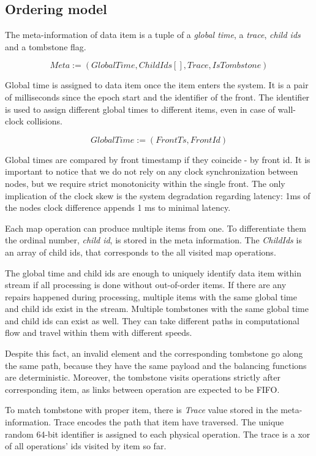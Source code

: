 \label{fs-impl}

\subsection{Ordering model}
The meta-information of data item is a tuple of a {\it global time}, a {\it trace}, {\it child ids} and a tombstone flag.

\[Meta := (GlobalTime, ChildIds[], Trace, IsTombstone)\]

Global time is assigned to data item once the item enters the system. It is a pair of milliseconds since the epoch start and the identifier of the front. The identifier is used to assign different global times to different items, even in case of wall-clock collisions. 

\[GlobalTime := (FrontTs, FrontId)\]

Global times are compared by front timestamp if they coincide - by front id. It is important to notice that we do not rely on any clock synchronization between nodes, but we require strict monotonicity within the single front. The only implication of the clock skew is the system degradation regarding latency: 1ms of the nodes clock difference appends 1 ms to minimal latency.

Each map operation can produce multiple items from one. To differentiate them the ordinal number, {\it child id}, is stored in the meta information. The {\it ChildIds } is an array of child ids, that corresponds to the all visited map operations.

The global time and child ids are enough to uniquely identify data item within stream if all processing is done without out-of-order items. If there are any repairs happened during processing, multiple items with the same global time and child ids exist in the stream. Multiple tombstones with the same global time and child ids can exist as well. They can take different paths in computational flow and travel within them with different speeds. 

Despite this fact, an invalid element and the corresponding tombstone go along the same path, because they have the same payload and the balancing functions are deterministic. Moreover, the tombstone visits operations strictly after corresponding item, as links between operation are expected to be FIFO. 

To match tombstone with proper item, there is {\it Trace} value stored in the meta-information. Trace encodes the path that item have traversed. The unique random 64-bit identifier is assigned to each physical operation. The trace is a xor of all operations' ids visited by item so far.

